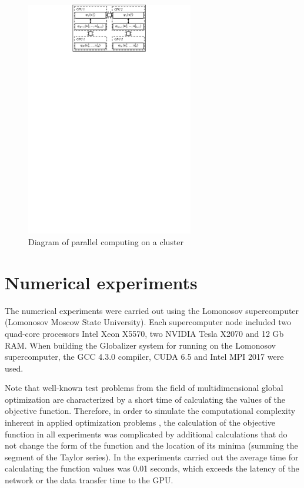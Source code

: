 \documentclass{svproc}
\begin{document}
   \begin{figure}[t]
    \centering
		\includegraphics[width=0.65\textwidth]{Parallel_Computing.pdf}
		\caption{Diagram of parallel computing on a cluster}\label{fig:Parallel_Computing}
\end{figure}

\section{Numerical experiments}

The numerical experiments were carried out using the Lomonosov supercomputer (Lomonosov Moscow State University). Each supercomputer node included two quad-core processors Intel Xeon X5570, two NVIDIA Tesla X2070 and 12 Gb RAM. When building the Globalizer system for running on the Lomonosov supercomputer, the GCC 4.3.0 compiler, CUDA 6.5 and Intel MPI 2017 were used.

Note that well-known test problems from the field of multidimensional global optimization are characterized by a short time of calculating the values of the objective function. Therefore, in order to simulate the computational complexity inherent in applied optimization problems \cite{Modorskii2016}, the calculation of the objective function in all experiments was complicated by additional calculations that do not change the form of the function and the location of its minima (summing the segment of the Taylor series). 
In the experiments carried out the average time for calculating the function values was 0.01 seconds, which exceeds the latency of the network or the data transfer time to the GPU.
\end{document}

